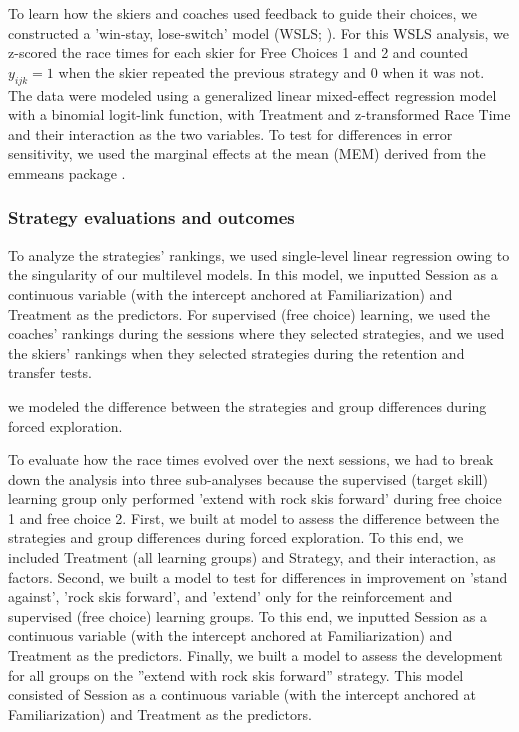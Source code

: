 \documentclass[pdflatex,sn-nature]{sn-jnl}%
\theoremstyle{thmstyleone}%
\theoremstyle{thmstyletwo}%
\theoremstyle{thmstylethree}%
\begin{document}
To learn how the skiers and coaches used feedback to guide their choices, we constructed a 'win-stay, lose-switch' model (WSLS; \cite{nowak_strategy_1993, worthy_comparison_2014, iyer_probing_2020}). For this WSLS analysis, we z-scored the race times for each skier for Free Choices 1 and 2 and counted \(y_{ijk}=1\) when the skier repeated the previous strategy and 0 when it was not. The data were modeled using a generalized linear mixed-effect regression model with a binomial logit-link function, with Treatment and z-transformed Race Time and their interaction as the two variables. To test for differences in error sensitivity, we used the marginal effects at the mean (MEM) derived from the emmeans package \cite{lenth_emmeans_2023}.


\subsubsection{Strategy evaluations and outcomes}
To analyze the strategies' rankings, we used single-level linear regression owing to the singularity of our multilevel models. In this model, we inputted Session as a continuous variable (with the intercept anchored at Familiarization) and Treatment as the predictors. For supervised (free choice) learning, we used the coaches' rankings during the sessions where they selected strategies, and we used the skiers' rankings when they selected strategies during the retention and transfer tests.

we modeled the difference between the strategies and group differences during forced exploration. 

To evaluate how the race times evolved over the next sessions, we had to break down the
analysis into three sub-analyses because the supervised (target skill) learning group only
performed ’extend with rock skis forward’ during free choice 1 and free choice 2. First, we built at model to assess the difference between the strategies and group differences during forced exploration. To this end, we included Treatment (all learning groups) and Strategy, and their interaction, as factors. Second, we built a model to test for differences in improvement on ’stand against’, ’rock skis forward’, and ’extend’ only for the reinforcement and supervised (free choice) learning
groups. To this end, we inputted Session as a continuous variable (with the intercept anchored at Familiarization) and Treatment as the predictors. Finally, we built a model to assess the development for all groups on the ”extend with rock skis forward” strategy. This model consisted of Session as a continuous variable (with the intercept anchored at Familiarization) and Treatment as the predictors.
\end{document}

